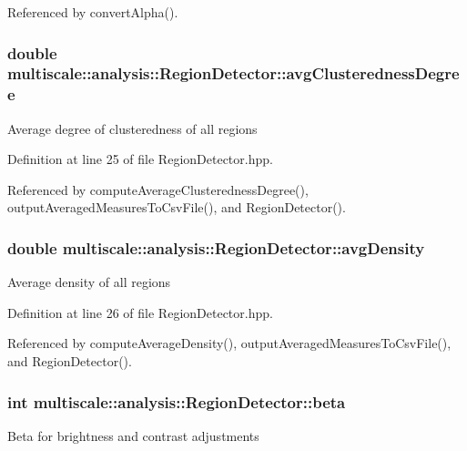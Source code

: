 Referenced by convert\-Alpha().

\hypertarget{classmultiscale_1_1analysis_1_1RegionDetector_ad2614f07ff1dfa25af6f7eaa10fe8ea8}{
\subsubsection[{avg\-Clusteredness\-Degree}]{\setlength{\rightskip}{0pt plus 5cm}double multiscale\-::analysis\-::\-Region\-Detector\-::avg\-Clusteredness\-Degree\hspace{0.3cm}{\ttfamily [private]}}}\label{classmultiscale_1_1analysis_1_1RegionDetector_ad2614f07ff1dfa25af6f7eaa10fe8ea8}
Average degree of clusteredness of all regions 

Definition at line 25 of file Region\-Detector.\-hpp.



Referenced by compute\-Average\-Clusteredness\-Degree(), output\-Averaged\-Measures\-To\-Csv\-File(), and Region\-Detector().

\hypertarget{classmultiscale_1_1analysis_1_1RegionDetector_a96d0cab2a5cd61b3820c87581fed9548}{
\subsubsection[{avg\-Density}]{\setlength{\rightskip}{0pt plus 5cm}double multiscale\-::analysis\-::\-Region\-Detector\-::avg\-Density\hspace{0.3cm}{\ttfamily [private]}}}\label{classmultiscale_1_1analysis_1_1RegionDetector_a96d0cab2a5cd61b3820c87581fed9548}
Average density of all regions 

Definition at line 26 of file Region\-Detector.\-hpp.



Referenced by compute\-Average\-Density(), output\-Averaged\-Measures\-To\-Csv\-File(), and Region\-Detector().

\hypertarget{classmultiscale_1_1analysis_1_1RegionDetector_a23c831170c2264dd7e59067a1a7d3c8e}{
\subsubsection[{beta}]{\setlength{\rightskip}{0pt plus 5cm}int multiscale\-::analysis\-::\-Region\-Detector\-::beta\hspace{0.3cm}{\ttfamily [private]}}}\label{classmultiscale_1_1analysis_1_1RegionDetector_a23c831170c2264dd7e59067a1a7d3c8e}
Beta for brightness and contrast adjustments 


